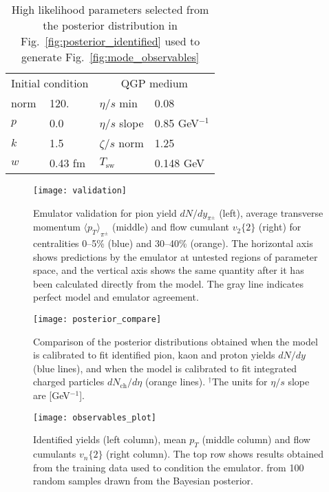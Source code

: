 \documentclass[aps,prc,reprint,amsmath,nofootinbib]{revtex4-1}
\newcommand{\nch}{N_\text{ch}}
\begin{document}
\begin{table}[h]
    \caption{High likelihood parameters selected from the posterior distribution in Fig.~\ref{fig:posterior_identified} used to generate Fig.~\ref{fig:mode_observables}}
    \begin{ruledtabular}    
        \begin{tabular}{llll}
            \multicolumn{2}{c}{Initial condition} & \multicolumn{2}{c}{QGP medium} \\
            \noalign{\smallskip}\hline\noalign{\smallskip}
            norm & 120.          &  $\eta/s$ min   & 0.08       \\
            $p$  & 0.0           &  $\eta/s$ slope & 0.85 GeV$^{-1}$   \\
            $k$  & 1.5           &  $\zeta/s$ norm & 1.25       \\
            $w$  & 0.43 fm       &  $T_\text{sw}$  & 0.148 GeV  \\
        \end{tabular}
    \end{ruledtabular}
    \label{table:likely_param}
\end{table}

\begin{figure*}
    \texttt{[image: validation]}
    \caption{Emulator validation for pion yield $dN/dy_{\pi^\pm}$ (left), average transverse momentum ${\langle p_T \rangle}_{\pi^\pm}$ (middle) and flow cumulant $v_2\{2\}$ (right) for centralities 0--5\% (blue) and 30--40\% (orange). The horizontal axis shows predictions by the emulator at untested regions of parameter space, and the vertical axis shows the same quantity after it has been calculated directly from the model. The gray line indicates perfect model and emulator agreement.} 
\end{figure*}

\begin{figure*}
    \texttt{[image: posterior\_compare]}
    \caption{Comparison of the posterior distributions obtained when the model is calibrated to fit identified pion, kaon and proton yields $dN/dy$ (blue lines), and when the model is calibrated to fit integrated charged particles $d\nch/d\eta$ (orange lines). $^\dagger$The units for $\eta/s$ slope are [GeV$^{-1}$].}
\end{figure*}

\begin{figure*}
    \texttt{[image: observables\_plot]}
    \caption{Identified yields (left column), mean $p_T$ (middle column) and flow cumulants $v_n\{2\}$ (right column). The top row shows results obtained from the training data used to condition the emulator. from 100 random samples drawn from the Bayesian posterior.}
\end{figure*}
\end{document}
